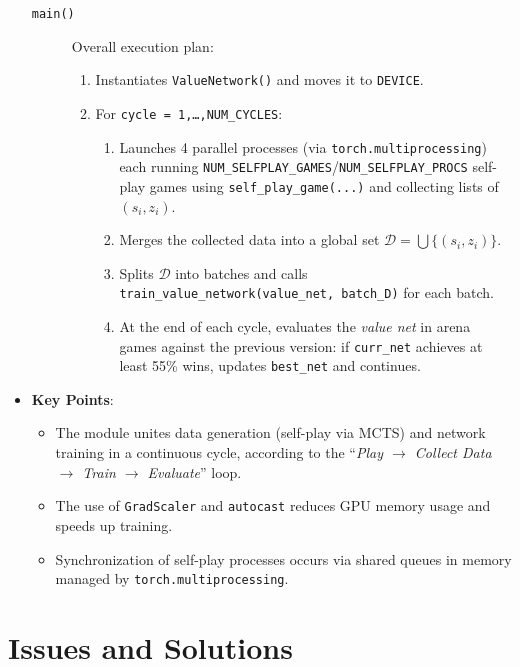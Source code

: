 \documentclass{report}
\begin{document}
\begin{itemize}
\begin{description}
      \item[\texttt{main()}]
        Overall execution plan:
        \begin{enumerate}
          \item Instantiates \texttt{ValueNetwork()} and moves it to \texttt{DEVICE}.
          \item For \texttt{cycle = 1,\dots,NUM\_CYCLES}:
            \begin{enumerate}
              \item Launches 4 parallel processes (via \texttt{torch.multiprocessing}) each running  
                    \texttt{NUM\_SELFPLAY\_GAMES}/\texttt{NUM\_SELFPLAY\_PROCS} self-play games using  
                    \texttt{self\_play\_game(...)} and collecting lists of \((s_i, z_i)\).
              \item Merges the collected data into a global set  
                    \(\mathcal{D} = \bigcup \{(s_i, z_i)\}\).
              \item Splits \(\mathcal{D}\) into batches and calls  
                    \texttt{train\_value\_network(value\_net, batch\_D)} for each batch.
              \item At the end of each cycle, evaluates the \emph{value net} in arena games  
                    against the previous version: if \texttt{curr\_net} achieves at least 55\% wins,  
                    updates \texttt{best\_net} and continues.
            \end{enumerate}
        \end{enumerate}
    \end{description}

  \item \textbf{Key Points}:
    \begin{itemize}
      \item The module unites data generation (self-play via MCTS) and network training in a continuous cycle, according to the “\textit{Play \(\rightarrow\) Collect Data \(\rightarrow\) Train \(\rightarrow\) Evaluate}” loop.
      \item The use of \texttt{GradScaler} and \texttt{autocast} reduces GPU memory usage and speeds up training.
      \item Synchronization of self-play processes occurs via shared queues in memory managed by \texttt{torch.multiprocessing}.
    \end{itemize}
\end{itemize}

\chapter{Issues and Solutions}
\end{document}
